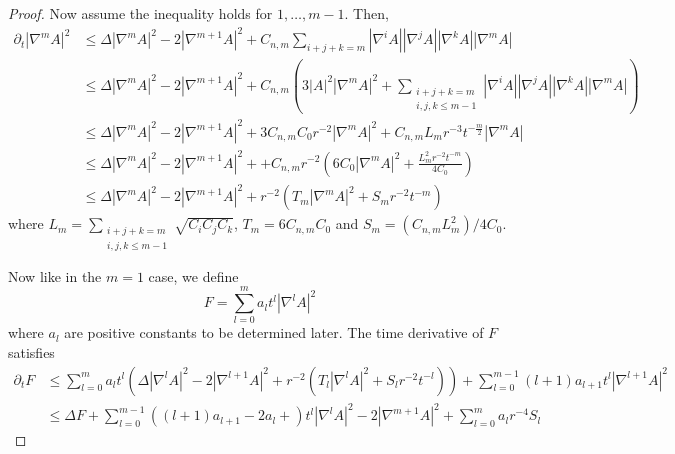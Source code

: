 \begin{proof}
    Now assume the inequality holds for $ 1, \dots,m-1 $. Then, 
    \begin{align*}
        \partial_{t}|\nabla^{m} A|^{2} &\le \Delta |\nabla^{m}A|^{2}- 2|\nabla^{m+1}A|^{2} + C_{n,m} \sum_{i+j+k= m}^{} |\nabla^{i}A||\nabla^{j}A||\nabla^{k}A||\nabla^{m}A|  \\
        & \le \Delta |\nabla^{m}A|^{2}- 2|\nabla^{m+1}A|^{2} + C_{n,m}\left( 3|A|^{2}|\nabla^{m}A|^{2} + \sum_{\substack{i+j+k=m\\i,j,k \le m-1}}^{}|\nabla^{i}A||\nabla^{j}A| |\nabla^{k}A||\nabla^{m} A|  \right) \\
        & \le \Delta|\nabla^{m}A|^{2}- 2|\nabla^{m+1}A|^{2}+ 3C_{n,m}C_{0}r^{-2}|\nabla^{m}A|^{2} + C_{n,m}L_{m}r^{-3}t^{-\frac{m}{2}}|\nabla^{m}A| \\
        & \le \Delta|\nabla^{m}A|^{2}- 2|\nabla^{m+1}A|^{2} + + C_{n,m}r^{-2}\left(6C_{0}|\nabla^{m}A|^{2} + \frac{L_{m}^{2}r^{-2}t^{-m}}{4C_{0}}  \right) \\
        & \le \Delta|\nabla^{m}A|^{2}- 2|\nabla^{m+1}A|^{2} + r^{-2}(T_{m}|\nabla^{m}A|^{2}+ S_{m}r^{-2}t^{-m})
    \end{align*}
    where $ L_{m} = \sum_{\substack{i+j+k=m\\i,j,k \le m-1}}\sqrt{C_{i}C_{j}C_{k}}  $, $ T_{m} = 6C_{n,m}C_{0} $ and $ S_{m} = (C_{n,m}L_{m}^{2}) / 4C_{0} $.

    Now like in the $ m=1 $ case, we define 
    \[ F = \sum_{l=0}^{m}a_{l}t^{l}|\nabla^{l} A|^{2} \]
    where $ a_{l} $ are positive constants to be determined later. The time derivative of $ F $ satisfies \begin{align*}
        \partial_{t}F & \le \sum_{l=0}^{m}a_{l}t^{l}\left(\Delta|\nabla^{l}A|^{2}- 2|\nabla^{l+1}A|^{2} + r^{-2}(T_{l}|\nabla^{l}A|^{2}+ S_{l}r^{-2}t^{-l}) \right) + \sum_{l=0}^{m-1}(l+1)a_{l+1}t^{l}|\nabla^{l+1}A|^{2} \\
        & \le \Delta F + \sum_{l=0}^{m-1}((l+1)a_{l+1}-2a_{l}+)t^{l}|\nabla^{l}A|^{2} -2|\nabla^{m+1}A|^{2} + \sum_{l=0}^{m}a_{l}r^{-4}S_{l} 
    \end{align*}


\end{proof}

